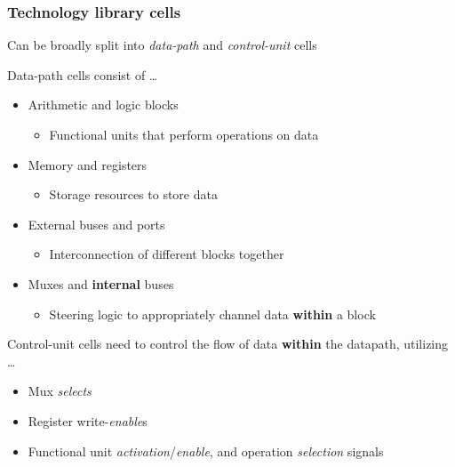 \documentclass{article}
\begin{document}
\subsubsection{Technology library cells}
Can be broadly split into \textit{data-path} and \textit{control-unit} cells

\begin{minipage}[t]{0.5\textwidth}
    Data-path cells consist of \dots
    \begin{itemize}
        \item Arithmetic and logic blocks
            \begin{itemize}
                \item Functional units that perform operations on data
            \end{itemize}
        \item Memory and registers
            \begin{itemize}
                \item Storage resources to store data
            \end{itemize}
        \item External buses and ports
            \begin{itemize}
                \item Interconnection of different blocks together
            \end{itemize}
        \item Muxes and \textbf{internal} buses
            \begin{itemize}
                \item Steering logic to appropriately channel data \textbf{within} a block
            \end{itemize}
    \end{itemize}
\end{minipage}%
\begin{minipage}[t]{0.5\textwidth}
    Control-unit cells need to control the flow of data \textbf{within} the datapath, utilizing \dots
    \begin{itemize}
        \item Mux \textit{selects}
        \item Register write-\textit{enable}s
        \item Functional unit \textit{activation}/\textit{enable}, and operation \textit{selection} signals
    \end{itemize}
\end{minipage}%
\end{document}
